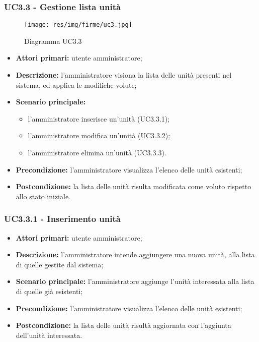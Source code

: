\subsubsection{UC3.3 - Gestione lista unità}
	\begin{center}
		\begin{figure}[h!]
			\texttt{[image: res/img/firme/uc3.jpg]}
			\caption{Diagramma UC3.3}
		\end{figure}
	\end{center}
	\begin{itemize}
		\item \textbf{Attori primari:} utente amministratore;
		\item \textbf{Descrizione:} l'amministratore visiona la lista delle unità presenti nel sistema, ed applica le modifiche volute;
		\item \textbf{Scenario principale:} 
			\begin{itemize}
				\item l'amministratore inserisce un'unità (UC3.3.1);
				\item l'amministratore modifica un'unità (UC3.3.2);
				\item l'amministratore elimina un'unità (UC3.3.3).
			\end{itemize}
		\item \textbf{Precondizione:} l'amministratore visualizza l'elenco delle unità esistenti;
		\item \textbf{Postcondizione:} la lista delle unità risulta modificata come voluto rispetto allo stato iniziale.
	\end{itemize}

\subsubsection{UC3.3.1 - Inserimento unità}
\begin{itemize}
	\item \textbf{Attori primari:} utente amministratore;
	\item \textbf{Descrizione:} l'amministratore intende aggiungere una nuova unità, alla lista di quelle gestite dal sistema;
	\item \textbf{Scenario principale:} l'amministratore aggiunge l'unità interessata alla lista di quelle già esistenti;
	\item \textbf{Precondizione:} l'amministratore visualizza l'elenco delle unità esistenti;
	\item \textbf{Postcondizione:} la lista delle unità risultà aggiornata con l'aggiunta dell'unità interessata.
\end{itemize}

